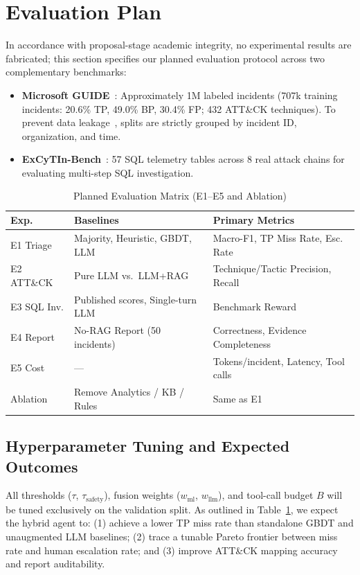 \section{Evaluation Plan}

In accordance with proposal-stage academic integrity, no experimental results are fabricated; this section specifies our planned evaluation protocol across two complementary benchmarks:
\begin{itemize}
    \item \textbf{Microsoft GUIDE}~\cite{freitas2024}: Approximately 1M labeled incidents (707k training incidents: 20.6\% TP, 49.0\% BP, 30.4\% FP; 432 ATT\&CK techniques). To prevent data leakage~\cite{arp2022,engelen2021}, splits are strictly grouped by incident ID, organization, and time.
    \item \textbf{ExCyTIn-Bench}~\cite{wu2026}: 57 SQL telemetry tables across 8 real attack chains for evaluating multi-step SQL investigation.
\end{itemize}

\begin{table}[t]
\centering
\caption{Planned Evaluation Matrix (E1--E5 and Ablation)}
\label{tab:eval_plan}
\begin{tabular}{@{}lll@{}}
\toprule
\textbf{Exp.} & \textbf{Baselines} & \textbf{Primary Metrics} \\
\midrule
E1 Triage & Majority, Heuristic, GBDT, LLM & Macro-F1, TP Miss Rate, Esc. Rate \\
E2 ATT\&CK & Pure LLM vs.\ LLM+RAG & Technique/Tactic Precision, Recall \\
E3 SQL Inv. & Published scores, Single-turn LLM & Benchmark Reward \\
E4 Report & No-RAG Report (50 incidents) & Correctness, Evidence Completeness \\
E5 Cost & --- & Tokens/incident, Latency, Tool calls \\
Ablation & Remove Analytics / KB / Rules & Same as E1 \\
\bottomrule
\end{tabular}
\end{table}

\subsection{Hyperparameter Tuning and Expected Outcomes}
All thresholds ($\tau$, $\tau_{\text{safety}}$), fusion weights ($w_{\text{ml}}$, $w_{\text{llm}}$), and tool-call budget $B$ will be tuned exclusively on the validation split. As outlined in Table~\ref{tab:eval_plan}, we expect the hybrid agent to: (1) achieve a lower TP miss rate than standalone GBDT and unaugmented LLM baselines; (2) trace a tunable Pareto frontier between miss rate and human escalation rate; and (3) improve ATT\&CK mapping accuracy and report auditability.
